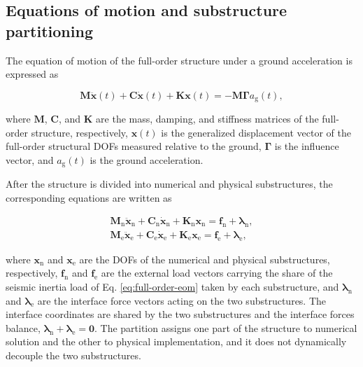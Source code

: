 \documentclass[a4paper,fleqn,review,12pt]{cas-sc}
\numberwithin{equation}{section}
\begin{document}
\subsection{Equations of motion and substructure partitioning}
The equation of motion of the full-order structure under a ground acceleration is expressed as

\begin{equation}
	\mathbf{M}\ddot{\bm{x}}(t)+\mathbf{C}\dot{\bm{x}}(t)+\mathbf{K}\bm{x}(t)
	=-\mathbf{M}\bm{\Gamma}a_{\mathrm{g}}(t),
	\label{eq:full-order-eom}
\end{equation}

\noindent where \(\mathbf{M}\), \(\mathbf{C}\), and \(\mathbf{K}\) are the mass, damping, and stiffness matrices of the full-order structure, respectively, \(\bm{x}(t)\) is the generalized displacement vector of the full-order structural DOFs measured relative to the ground, \(\bm{\Gamma}\) is the influence vector, and \(a_{\mathrm{g}}(t)\) is the ground acceleration.

After the structure is divided into numerical and physical substructures, the corresponding equations are written as

\begin{subequations}
	\label{eq:substructure-eom}
	\begin{align}
		\mathbf{M}_{\mathrm{n}}\ddot{\bm{x}}_{\mathrm{n}}
		+\mathbf{C}_{\mathrm{n}}\dot{\bm{x}}_{\mathrm{n}}
		+\mathbf{K}_{\mathrm{n}}\bm{x}_{\mathrm{n}}
		=\bm{f}_{\mathrm{n}}{}+\bm{\lambda}_{\mathrm{n}},
		\label{eq:numerical-eom}\\
		\mathbf{M}_{\mathrm{e}}\ddot{\bm{x}}_{\mathrm{e}}
		+\mathbf{C}_{\mathrm{e}}\dot{\bm{x}}_{\mathrm{e}}
		+\mathbf{K}_{\mathrm{e}}\bm{x}_{\mathrm{e}}
		=\bm{f}_{\mathrm{e}}{}+\bm{\lambda}_{\mathrm{e}},
		\label{eq:physical-eom}
	\end{align}
\end{subequations}

\noindent where \(\bm{x}_{\mathrm{n}}\) and \(\bm{x}_{\mathrm{e}}\) are the DOFs of the numerical and physical substructures, respectively, \(\bm{f}_{\mathrm{n}}\) and \(\bm{f}_{\mathrm{e}}\) are the external load vectors carrying the share of the seismic inertia load of Eq. \eqref{eq:full-order-eom} taken by each substructure, and \(\bm{\lambda}_{\mathrm{n}}\) and \(\bm{\lambda}_{\mathrm{e}}\) are the interface force vectors acting on the two substructures. The interface coordinates are shared by the two substructures and the interface forces balance, \(\bm{\lambda}_{\mathrm{n}}+\bm{\lambda}_{\mathrm{e}}=\bm{0}\). The partition assigns one part of the structure to numerical solution and the other to physical implementation, and it does not dynamically decouple the two substructures.
\end{document}
